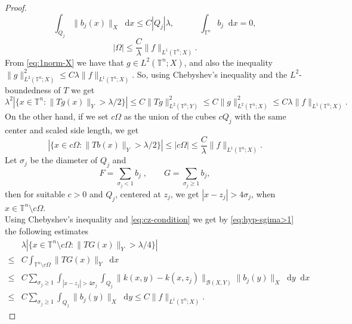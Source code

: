 \documentclass[12pt, reqno]{amsart}
\theoremstyle{definition}
\theoremstyle{remark}
\numberwithin{equation}{section}
\newcommand*\diff{\mathop{}\!\mathrm{d}}
\begin{document}
\begin{proof}
    \begin{equation}
        \int_{Q_j} \|b_j(x)\|_X \diff x \leq C|Q_j|\lambda, \quad  \quad \quad \int_{\mathbb{T}^n} b_j \diff x = 0,
        \label{eq:cz-condition}
    \end{equation}
    \begin{equation*}
        |\Omega| \leq \frac{C}{\lambda}\|f\|_{L^1(\mathbb{T}^n; X)}.
    \end{equation*}
    From \cref{eq:1norm-X} we have that $g \in L^2(\mathbb{T}^n; X)$, and also the inequality $\|g\|_{L^2(\mathbb{T}^n; X)}^2 \leq C\lambda \|f\|_{L^1(\mathbb{T}^n; X)}$. So, using Chebyshev's inequality and the $L^2$-boundedness of $T$ we get
    \begin{equation*}
        \lambda^2 |\{x \in \mathbb{T}^n : \|Tg(x)\|_Y > \lambda/2\}| \leq C\|Tg\|_{L^2(\mathbb{T}^n; Y)}^2 \leq C\|g\|_{L^2(\mathbb{T}^n; X)}^2 \leq C\lambda\|f\|_{L^1(\mathbb{T}^n; X)}.
    \end{equation*}
    On the other hand, if we set $c\Omega$ as the union of the cubes $cQ_j$ with the same center and scaled side length, we get
    \begin{equation*}
        |\{ x \in c\Omega : \|Tb(x)\|_Y > \lambda/2  \}| \leq |c\Omega| \leq \frac{C}{\lambda}\|f\|_{L^1(\mathbb{T}^n; X)}.
    \end{equation*}
    Let $\sigma_j$ be the diameter of $Q_j$ and
    \begin{equation*}
        F = \sum_{\sigma_j < 1} b_j\;, \quad  \quad G = \sum_{\sigma_j \geq 1}b_j,
    \end{equation*}
    then for suitable $c>0$ and $Q_j$, centered at $z_j$, we get $|x - z_j| > 4\sigma_j$, when $x \in \mathbb{T}^n \setminus c\Omega$. \\
    Using Chebyshev's inequality and \cref{eq:cz-condition} we get by \cref{eq:hyp-sgima>1} the following estimates
    \begin{align*}
       & \lambda|\{ x \in \mathbb{T}^n \setminus c\Omega : \|TG(x)\|_Y > \lambda/4 \}| \\
       \leq & C \int_{\mathbb{T}^n \setminus c\Omega} \|TG(x)\|_Y \diff x \\
        \leq & 
        C\sum_{\sigma_j \geq 1} \int_{|x-z_j|>4\sigma_j} \int_{Q_j} \|k(x, y) - k(x, z_j)\|_{\mathcal{B}(X, Y)}\|b_j(y)\|_X \diff y \diff x \\
        \leq & C\sum_{\sigma_j \geq 1} \int_{Q_j}\|b_j(y)\|_X \diff y \leq C\|f\|_{L^1(\mathbb{T}^n; X)}.
    \end{align*}

\end{proof}
\end{document}
